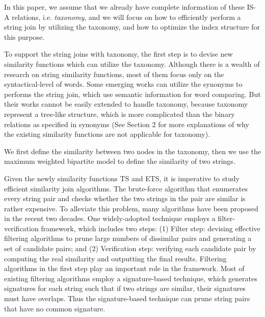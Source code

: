 In this paper, we assume that we already have complete
information of these IS-A relations, i.e. \textit{taxonomy}, and we will focus on how
to efficiently perform a string join by utilizing the taxonomy, and how to optimize the index structure
for this purpose.



To support the string joins with taxonomy, the first step is to devise new similarity functions which can utilize the taxonomy. Although there is a wealth of research on string similarity functions, most of them focus only on the syntactical-level of words. Some emerging works  \cite{conf/icde/ArasuCK08} can utilize the synonyms to performs the string join, which use semantic information for word comparing. But their works cannot be easily extended to handle taxonomy, because  taxonomy represent a tree-like structure, which is more complicated than the binary relations as specified in synonyms (See Section 2 for more explanations of why the existing similarity functions are not applicable for taxonomy).




We first define the similarity between two nodes in the taxonomy, then we use the maximum weighted bipartite model to define the similarity of two strings.

Given the newly similarity functions TS and ETS, it is imperative to study efficient similarity join algorithms. The brute-force algorithm that enumerates every string pair and checks whether the two strings in the pair are similar is rather expensive. To alleviate this problem, many algorithms have been proposed in the recent two decades. One widely-adopted technique employs a filter-verification framework, which includes two steps: (1) Filter step: devising effective filtering algorithms to prune large numbers of dissimilar pairs and generating a set of candidate pairs; and (2) Verification step: verifying each candidate pair by computing
the real similarity and outputting the final results. Filtering algorithms in the first step play an important role
in the framework. Most of existing filtering algorithms employ a signature-based technique, which generates signatures for each string such that if two strings are similar, their signatures must have overlaps. Thus the signature-based technique can prune string pairs that have no common signature.

